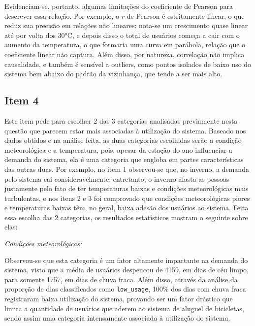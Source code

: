 Evidenciam-se, portanto, algumas limitações do coeficiente de Pearson para descrever essa relação. Por exemplo, o $r$ de Pearson é estritamente linear, o que reduz sua precisão em relações não lineares: nota-se um crescimento quase linear até por volta dos 30°C, e depois disso o total de usuários começa a cair com o aumento da temperatura, o que formaria uma curva em parábola, relação que o coeficiente linear não captura. Além disso, por natureza, correlação não implica causalidade, e também é sensível a outliers, como pontos isolados de baixo uso do sistema bem abaixo do padrão da vizinhança, que tende a ser mais alto.


\subsection*{Item 4}
Este item pede para escolher 2 das 3 categorias analisadas previamente nesta questão que parecem estar mais associadas à utilização do sistema. Baseado nos dados obtidos e na análise feita, as duas categorias escolhidas serão a condição meteorológica e a temperatura, pois, apesar da estação do ano influenciar a demanda do sistema, ela é uma categoria que engloba em partes características das outras duas. Por exemplo, no item 1 observou-se que, no inverno, a demanda pelo sistema cai consideravelmente; entretanto, o inverno afasta as pessoas justamente pelo fato de ter temperaturas baixas e condições meteorológicas mais turbulentas, e nos itens 2 e 3 foi comprovado que condições meteorológicas piores e temperaturas baixas têm, no geral, baixa adesão dos usuários ao sistema. Feita essa escolha das 2 categorias, os resultados estatísticos mostram o seguinte sobre elas:

\textit{Condições meteorológicas:}

Observou-se que esta categoria é um fator altamente impactante na demanda do sistema, visto que a média de usuários despencou de 4159, em dias de céu limpo, para somente 1757, em dias de chuva fraca. Além disso, através da análise da proporção de dias classificados como \texttt{low\_usage}, 100\% dos dias com chuva fraca registraram baixa utilização do sistema, provando ser um fator drástico que limita a quantidade de usuários que aderem ao sistema de aluguel de bicicletas, sendo assim uma categoria intensamente associada à utilização do sistema.

